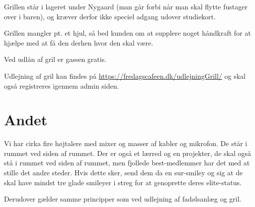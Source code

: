 Grillen står i lageret under Nygaard (man går forbi når man skal flytte fustager over i baren), og kræver derfor ikke speciel adgang udover studiekort.

Grillen mangler pt. et hjul, så bed kunden om at supplere noget håndkraft for at hjælpe med at få den derhen hvor den skal være.

Ved udlån af gril er gassen gratis.

Udlejning af gril kan findes på \url{https://fredagscafeen.dk/udlejningGrill/} og skal også registreres igennem admin siden.

\section{Andet}
Vi har cirka fire højtalere med mixer og masser af kabler og mikrofon. De står i rummet ved siden af rummet. Der er også et lærred og en projekter, de skal også stå i rummet ved siden af rummet, men fjollede best-medlemmer har det med at stille det andre steder. Hvis dette sker, send dem da en sur-smiley og sig at de skal have mindst tre glade smileyer i streg for at genoprette deres elite-status.

Derudover gælder samme principper som ved udlejning af fadølsanlæg og gril.



